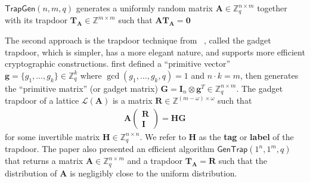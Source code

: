 \documentclass[cryptography,review,submit,pdftex,moreauthors,amsmath,amssymb,aps,strict]{Definitions/mdpi}
\let\oldalgorithmic\algorithmic
\let\endoldalgorithmic\endalgorithmic
\renewenvironment{algorithmic}
{\begin{adjustwidth}{-1em}{}\oldalgorithmic}
{\endoldalgorithmic\end{adjustwidth}}
\begin{document}
\begin{algorithm}[!htbp]
	\begin{algorithmic}
        \State{}
		\EndFunction
	\end{algorithmic}
	\caption{$\mathsf{TrapGen}(n,m,q)$ generates a uniformly random matrix $\mathbf{A}\in\mathbb{Z}^{n\times m}_q$ together with its trapdoor $\mathbf{T}_\mathbf{A}\in\mathbb{Z}^{m\times m}$ such that $\mathbf{A}\mathbf{T}_{\mathbf{A}}=\mathbf{0}$} \label{alg:trapgen}
\end{algorithm}

The second approach is the trapdoor technique from ~\cite{MP12}, called the gadget trapdoor, which is simpler, has a more elegant nature, and supports more efficient cryptographic constructions. \cite{MP12} first defined a ``primitive vector'' $\mathbf{g}=\{g_1,\dots,g_k\}\in\mathbb{Z}^k_q$ where $\gcd(g_1,\dots,g_k,q)=1$ and $n\cdot k=m$, then generates the ``primitive matrix'' (or gadget matrix) $\mathbf{G}=\mathbf{I}_n\otimes\mathbf{g}^T\in\mathbb{Z}^{n\times m}_q$. The gadget trapdoor of a lattice $\mathcal{L}(\mathbf{A})$ is a matrix $\mathbf{R}\in\mathbb{Z}^{(m-\omega)\times \omega}$ such that 
\begin{align}
    \mathbf{A}\begin{pmatrix}
    \mathbf{R}\\ 
    \mathbf{I}
  \end{pmatrix} = \mathbf{H}\mathbf{G}
  \label{eq:gadget_matrix}
\end{align}
for some invertible matrix $\mathbf{H}\in\mathbb{Z}^{n\times n}_q$. We refer to $\mathbf{H}$ as the \textbf{tag} or \textbf{label} of the trapdoor. The paper also presented an efficient algorithm $\mathsf{GenTrap}(1^n,1^m,q)$ that returns a matrix $\mathbf{A}\in\mathbb{Z}^{n\times m}_q$ and a trapdoor $\mathbf{T}_{\mathbf{A}}=\mathbf{R}$ such that the distribution of $\mathbf{A}$ is negligibly close to the uniform distribution. 
\end{document}
